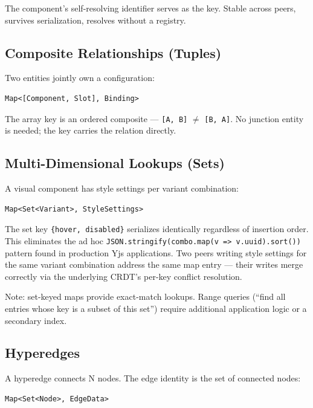 The component's self-resolving identifier serves as the key. Stable across peers, survives serialization, resolves without a registry.

\subsection{Composite Relationships (Tuples)}

Two entities jointly own a configuration:

\begin{lstlisting}
Map<[Component, Slot], Binding>
\end{lstlisting}

The array key is an ordered composite --- \texttt{[A, B]} $\neq$ \texttt{[B, A]}. No junction entity is needed; the key carries the relation directly.

\subsection{Multi-Dimensional Lookups (Sets)}

A visual component has style settings per variant combination:

\begin{lstlisting}
Map<Set<Variant>, StyleSettings>
\end{lstlisting}

The set key \texttt{\{hover, disabled\}} serializes identically regardless of insertion order. This eliminates the ad hoc \texttt{JSON.stringify(combo.map(v =\textgreater{} v.uuid).sort())} pattern found in production Yjs applications. Two peers writing style settings for the same variant combination address the same map entry --- their writes merge correctly via the underlying CRDT's per-key conflict resolution.

Note: set-keyed maps provide exact-match lookups. Range queries (``find all entries whose key is a subset of this set'') require additional application logic or a secondary index.

\subsection{Hyperedges}

A hyperedge connects N nodes. The edge identity is the set of connected nodes:

\begin{lstlisting}
Map<Set<Node>, EdgeData>
\end{lstlisting}

